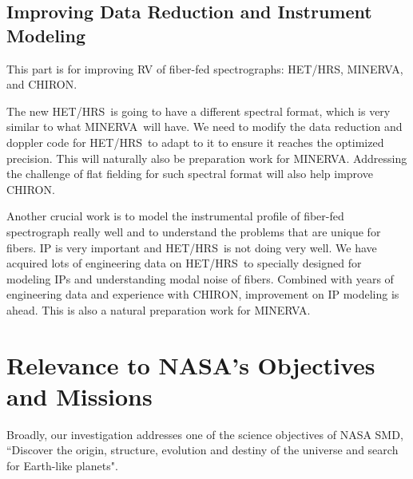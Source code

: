 \documentclass[12pt]{article}
\def\minerva{MINERVA}
\def\hrs{HET/HRS}
\begin{document}
\vspace{-3pt}
\subsection{Improving Data Reduction and Instrument Modeling}\label{sec:ip}

This part is for improving RV of fiber-fed spectrographs: \hrs,
\minerva, and CHIRON.

The new \hrs\ is going to have a different spectral format, which is
very similar to what \minerva\ will have. We need to modify the data
reduction and doppler code for \hrs\ to adapt to it to ensure it
reaches the optimized precision. This will naturally also be
preparation work for \minerva. Addressing the challenge of flat
fielding for such spectral format will also help improve CHIRON.

Another crucial work is to model the instrumental profile of fiber-fed
spectrograph really well and to understand the problems that are
unique for fibers. IP is very important and \hrs\ is not doing very
well. We have acquired lots of engineering data on
\hrs\ to specially designed for modeling IPs and understanding modal
noise of fibers. Combined with years of engineering data and
experience with CHIRON, improvement on IP modeling is ahead. This is
also a natural preparation work for \minerva.



 
\vspace{-3pt}
\section{Relevance to NASA's Objectives and Missions}

Broadly, our investigation addresses one of the science
objectives of NASA SMD, ``Discover the origin, structure, evolution
and destiny of the universe and search for Earth-like planets".
\end{document}
